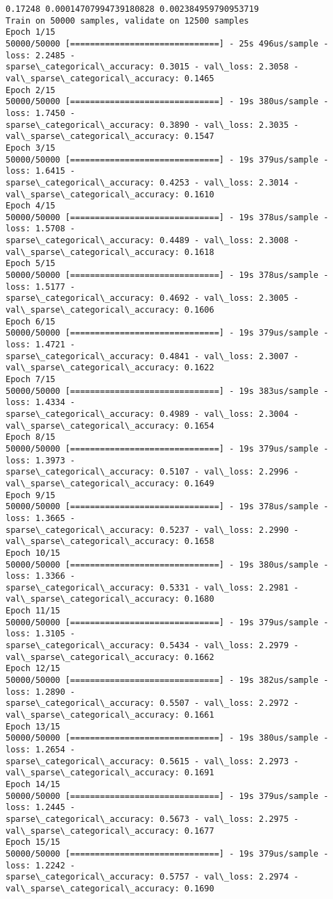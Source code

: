 \documentclass[11pt]{article}
\begin{document}
    \begin{Verbatim}[commandchars=\\\{\}]
0.17248 0.00014707994739180828 0.002384959790953719
Train on 50000 samples, validate on 12500 samples
Epoch 1/15
50000/50000 [==============================] - 25s 496us/sample - loss: 2.2485 -
sparse\_categorical\_accuracy: 0.3015 - val\_loss: 2.3058 -
val\_sparse\_categorical\_accuracy: 0.1465
Epoch 2/15
50000/50000 [==============================] - 19s 380us/sample - loss: 1.7450 -
sparse\_categorical\_accuracy: 0.3890 - val\_loss: 2.3035 -
val\_sparse\_categorical\_accuracy: 0.1547
Epoch 3/15
50000/50000 [==============================] - 19s 379us/sample - loss: 1.6415 -
sparse\_categorical\_accuracy: 0.4253 - val\_loss: 2.3014 -
val\_sparse\_categorical\_accuracy: 0.1610
Epoch 4/15
50000/50000 [==============================] - 19s 378us/sample - loss: 1.5708 -
sparse\_categorical\_accuracy: 0.4489 - val\_loss: 2.3008 -
val\_sparse\_categorical\_accuracy: 0.1618
Epoch 5/15
50000/50000 [==============================] - 19s 378us/sample - loss: 1.5177 -
sparse\_categorical\_accuracy: 0.4692 - val\_loss: 2.3005 -
val\_sparse\_categorical\_accuracy: 0.1606
Epoch 6/15
50000/50000 [==============================] - 19s 379us/sample - loss: 1.4721 -
sparse\_categorical\_accuracy: 0.4841 - val\_loss: 2.3007 -
val\_sparse\_categorical\_accuracy: 0.1622
Epoch 7/15
50000/50000 [==============================] - 19s 383us/sample - loss: 1.4334 -
sparse\_categorical\_accuracy: 0.4989 - val\_loss: 2.3004 -
val\_sparse\_categorical\_accuracy: 0.1654
Epoch 8/15
50000/50000 [==============================] - 19s 379us/sample - loss: 1.3973 -
sparse\_categorical\_accuracy: 0.5107 - val\_loss: 2.2996 -
val\_sparse\_categorical\_accuracy: 0.1649
Epoch 9/15
50000/50000 [==============================] - 19s 378us/sample - loss: 1.3665 -
sparse\_categorical\_accuracy: 0.5237 - val\_loss: 2.2990 -
val\_sparse\_categorical\_accuracy: 0.1658
Epoch 10/15
50000/50000 [==============================] - 19s 380us/sample - loss: 1.3366 -
sparse\_categorical\_accuracy: 0.5331 - val\_loss: 2.2981 -
val\_sparse\_categorical\_accuracy: 0.1680
Epoch 11/15
50000/50000 [==============================] - 19s 379us/sample - loss: 1.3105 -
sparse\_categorical\_accuracy: 0.5434 - val\_loss: 2.2979 -
val\_sparse\_categorical\_accuracy: 0.1662
Epoch 12/15
50000/50000 [==============================] - 19s 382us/sample - loss: 1.2890 -
sparse\_categorical\_accuracy: 0.5507 - val\_loss: 2.2972 -
val\_sparse\_categorical\_accuracy: 0.1661
Epoch 13/15
50000/50000 [==============================] - 19s 380us/sample - loss: 1.2654 -
sparse\_categorical\_accuracy: 0.5615 - val\_loss: 2.2973 -
val\_sparse\_categorical\_accuracy: 0.1691
Epoch 14/15
50000/50000 [==============================] - 19s 379us/sample - loss: 1.2445 -
sparse\_categorical\_accuracy: 0.5673 - val\_loss: 2.2975 -
val\_sparse\_categorical\_accuracy: 0.1677
Epoch 15/15
50000/50000 [==============================] - 19s 379us/sample - loss: 1.2242 -
sparse\_categorical\_accuracy: 0.5757 - val\_loss: 2.2974 -
val\_sparse\_categorical\_accuracy: 0.1690
    \end{Verbatim}
\end{document}
